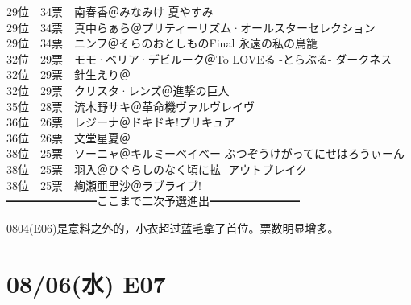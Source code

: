 {    29位　34票　南春香＠みなみけ 夏やすみ\\
    29位　34票　真中らぁら＠プリティーリズム·オールスターセレクション\\
    29位　34票　ニンフ＠そらのおとしものFinal 永遠の私の鳥籠\\
    32位　29票　モモ·ベリア·デビルーク＠To LOVEる -とらぶる- ダークネス\\
    32位　29票　針生えり＠\Saki\\
    32位　29票　クリスタ·レンズ＠進撃の巨人\\
    35位　28票　流木野サキ＠革命機ヴァルヴレイヴ\\
    36位　26票　レジーナ＠ドキドキ!プリキュア\\
    36位　26票　文堂星夏＠\Saki\\
    38位　25票　ソーニャ＠キルミーベイベー ぶつぞうけがってにせはろうぃーん\\
    38位　25票　羽入＠ひぐらしのなく頃に拡 -アウトブレイク-\\
    38位　25票　絢瀬亜里沙＠ラブライブ!\\
    ━━━━━━━━ここまで二次予選進出━━━━━━━━
}

0804(E06)是意料之外的，小衣超过蓝毛拿了首位。票数明显增多。

\section{08/06(水) E07}


